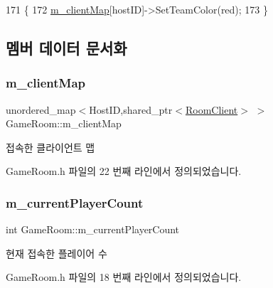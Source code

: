 \begin{DoxyCode}
171 \{
172     \hyperlink{class_game_room_afc202a511605453216f7dd870ff96c5c}{m\_clientMap}[hostID]->SetTeamColor(red);
173 \}
\end{DoxyCode}


\subsection{멤버 데이터 문서화}
\mbox{\label{class_game_room_afc202a511605453216f7dd870ff96c5c}} 
\subsubsection{\texorpdfstring{m\+\_\+client\+Map}{m\_clientMap}}
{\footnotesize\ttfamily unordered\+\_\+map$<$Host\+ID,shared\+\_\+ptr$<$\hyperlink{class_room_client}{Room\+Client}$>$ $>$ Game\+Room\+::m\+\_\+client\+Map\hspace{0.3cm}{\ttfamily [private]}}



접속한 클라이언트 맵 



Game\+Room.\+h 파일의 22 번째 라인에서 정의되었습니다.

\mbox{\label{class_game_room_a36763ea909947d8d02dd2a00ee835e10}} 
\subsubsection{\texorpdfstring{m\+\_\+current\+Player\+Count}{m\_currentPlayerCount}}
{\footnotesize\ttfamily int Game\+Room\+::m\+\_\+current\+Player\+Count\hspace{0.3cm}{\ttfamily [private]}}



현재 접속한 플레이어 수 



Game\+Room.\+h 파일의 18 번째 라인에서 정의되었습니다.

\mbox{\label{class_game_room_a47c8f21ede7fd6fa526ebfcb069dcf45}} 
